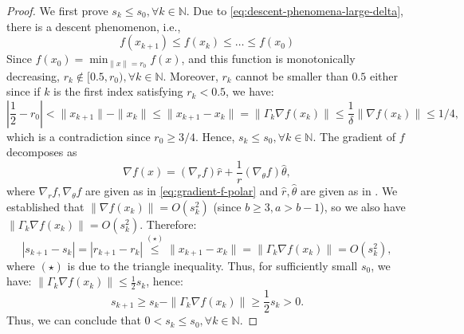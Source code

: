 \documentclass{article}
\theoremstyle{plain}
\theoremstyle{definition}
\theoremstyle{remark}
\newcommand*{\NN}{\mathbb{N}}
\begin{document}
\begin{proof}
    We first prove $s_k \leq s_0, \forall k \in \NN$. Due to \eqref{eq:descent-phenomena-large-delta}, there is a descent phenomenon, i.e.,
    \begin{equation*}
        f(x_{k+1}) \leq f(x_k) \leq \ldots \leq f(x_0) 
    \end{equation*}
    Since $f(x_0) = \min_{\|x\| = r_0} f(x)$, and this function is monotonically decreasing, $r_k \notin [0.5,r_0), \forall k \in \NN$. Moreover, $r_k$ cannot be smaller than $0.5$ either since if $k$ is the first index satisfying $r_k < 0.5$, we have:
    \begin{equation*}
        \left|\frac{1}{2} - r_0\right| < \|x_{k+1}\| - \|x_k\| \leq \|x_{k + 1} - x_k\| = \|\Gamma_k\nabla f(x_k)\| \leq \frac{1}{\delta} \|\nabla f(x_k)\| \leq 1/4,
    \end{equation*}
    which is a contradiction since $r_0 \geq 3/4$. Hence, $s_k \leq s_0, \forall k \in \NN$.
    The gradient of $f$ decomposes as 
    \begin{equation*}
        \nabla f(x) = (\nabla_r f) \hat{r} + \frac{1}{r} (\nabla_\theta f) \hat{\theta},
    \end{equation*}
    where $\nabla_r f, \nabla_\theta f$ are given as in \eqref{eq:gradient-f-polar} and $\hat{r}, \hat{\theta}$ are given as in .
    We established that $\|\nabla f(x_k)\| = O(s_k^2)$ (since $b \geq 3, a > b - 1$),
    so we also have $\|\Gamma_k \nabla f(x_k)\| = O(s_k^2)$. Therefore:
    \begin{equation*}
        |s_{k + 1} - s_k| = |r_{k + 1} - r_k| \overset{(\star)}{\leq} \|x_{k+1} - x_k\| = \|\Gamma_k\nabla f(x_k)\| = O(s_k^{2}),
    \end{equation*}
    where $(\star)$ is due to the triangle inequality. Thus, for sufficiently small $s_0$, we have: $\|\Gamma_k\nabla f(x_k)\| \leq \frac{1}{2}s_k$, hence:
    \begin{equation}
        s_{k + 1} \geq s_k - \|\Gamma_k\nabla f(x_k)\| \geq \frac{1}{2} s_k > 0.
    \end{equation}
    Thus, we can conclude that $0 < s_k \leq s_0, \forall k \in \NN$.
    

\end{proof}
\end{document}

